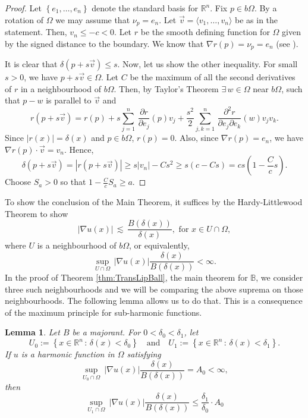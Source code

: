 \documentclass[12pt,a4paper]{amsart}
\numberwithin{equation}{section}
\newtheorem{lemma}[equation]{Lemma}
\theoremstyle{definition}
\begin{document}
\begin{proof}
Let $\left\{e_1,\ldots, e_n\right\}$ denote the standard basis for $\mathbb{R}^n$. Fix $p\in b\Omega$. By a rotation of $\Omega$ we may assume that $\nu_p  = e_n$. Let $\vec{v} = 
\langle v_1, \ldots, v_n\rangle$ be as in the statement. Then, $v_n\le -c < 0$. Let $r$ be the smooth defining function for $\Omega$ given by the signed distance to the boundary. We know that $\nabla r(p) = \nu_p = e_n$ (see \cite[Corollary 5.3]{Her-McN10}).
 
It is clear that $\delta(p+s\vec{v})\le s$. Now, let us show the other inequality. For small $s>0$, we have $p+s\vec{v} \in \Omega$. Let $C$ be the maximum of all the second derivatives of $r$ in a 
neighbourhood of $b\Omega$. Then, by Taylor's Theorem $\exists\, w \in \Omega$ near $b\Omega$, such that $p-w$ is parallel to $\vec{v}$ and
\[r(p+s\vec{v}) =  r(p) +s\sum_{j=1}^n\, \frac{\partial r}{\partial e_j}(p)v_j + \frac{s^2}{2}\sum_{j,k=1}^n\, \frac{\partial^2 r}{\partial e_j \partial e_k}(w)v_jv_k.\]
Since ${\left\lvert{r(x)}\right\rvert}=\delta(x)$ and $p\in b\Omega$, $r(p)=0$. Also, since $\nabla r(p)=e_n$, we have 
$\nabla r(p) \cdot \vec{v} = v_n$. Hence,
\[\delta(p+s\vec{v})={\left\lvert{r(p+s\vec{v})}\right\rvert} \geq s{\left\lvert{v_n}\right\rvert} - Cs^2 \geq s(c-Cs) = cs \left(1-\frac{C}{c}s\right).\]
Choose $S_a>0$ so that $1-\frac{C}{c}S_a \geq a$.
\end{proof}

To show the conclusion of the Main Theorem, it suffices by the Hardy-Littlewood Theorem to show
\[{\left\lvert{\nabla u(x)}\right\rvert} \,\lesssim\, \frac{B(\delta(x))}{\delta(x)}, \text{ for } x\in U\cap\Omega,\]
where $U$ is a neighbourhood of $b\Omega$, or equivalently,
\[\sup\limits_{U\cap\Omega}\, {\left\lvert{\nabla u(x)}\right\rvert}\frac{\delta(x)}{B(\delta(x))}  < \infty .\]
In the proof of Theorem \ref{thm:TransLipBall}, the main theorem for $\mathbb{B}$, we consider three such neighbourhoods and we will be comparing the above suprema on those neighbourhoods. The following lemma allows us to do 
that. This is a consequence of the maximum principle for sub-harmonic functions.

\begin{lemma}\label{lemma:EstOutsideCpt}
Let $B$ be a majorant. For $0<\delta_0<\delta_1$, let 
\[U_0 := \left\{ x\in\mathbb{R}^n \, :\, \delta(x) < \delta_0\right\} \quad\text{and}\quad U_1 := \left\{ x\in\mathbb{R}^n\, :\, \delta(x) < \delta_1\right\}.\]
If $u$ is a harmonic function in $\Omega$ satisfying
\[\sup\limits_{U_0\cap\Omega }\ {\left\lvert{\nabla u(x)}\right\rvert}\frac{\delta(x)}{B(\delta(x))} = A_0 < \infty,\]
then
\[\sup\limits_{U_1\cap\Omega}\ {\left\lvert{\nabla u(x)}\right\rvert}\frac{\delta(x)}{B(\delta(x))} \le \frac{\delta_1}{\delta_0}\cdot A_0\]
\end{lemma}
\end{document}
